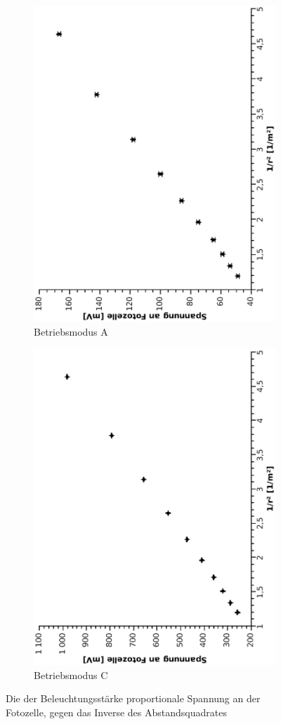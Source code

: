 \documentclass[12pt,a4paper,twopage]{article}
\begin{document}

\begin{figure}
\centering
\begin{subfigure}{0.48\linewidth}
\includegraphics[width=0.75\linewidth, angle=-90]{niedrigetemp.eps}
\caption{ \label{figLowTemp} Betriebsmodus A}
\end{subfigure}
\begin{subfigure}{0.48\linewidth}
\includegraphics[width=0.75\linewidth, angle=-90]{hohetemp.eps}
\caption{Betriebsmodus \label{figHighTemp} C}
\end{subfigure}
\caption{Die der Beleuchtungsstärke proportionale Spannung an der Fotozelle, gegen das Inverse des Abstandsquadrates}
\end{figure}
\end{document}
